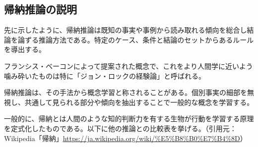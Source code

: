 \documentclass[dvipdfmx]{jsarticle}
\begin{document}
\subsection{帰納推論の説明}
先に示したように、帰納推論は既知の事実や事例から読み取れる傾向を総合し結論を論ずる推論方法である。特定のケース、条件と結論のセットからあるルールを導出する。\par
フランシス・ベーコンによって提案された概念で、これをより人間学に近いよう噛み砕いたものは特に「ジョン・ロックの経験論」と呼ばれる。\par
帰納推論は、その手法から概念学習と称されることがある。個別事実の細部を無視し、共通して見られる部分や傾向を抽出することで一般的な概念を学習する。\par
一般的に、帰納とは人間のような知的判断力を有する生物が行動を学習する原理を定式化したものである。以下に他の推論との比較表を挙げる。（引用元：Wikipedia「帰納」\url{https://ja.wikipedia.org/wiki/%E5%B8%B0%E7%B4%8D}）
\begin{table}[H]
\caption{推論手法の比較}
\end{table}
\end{document}
